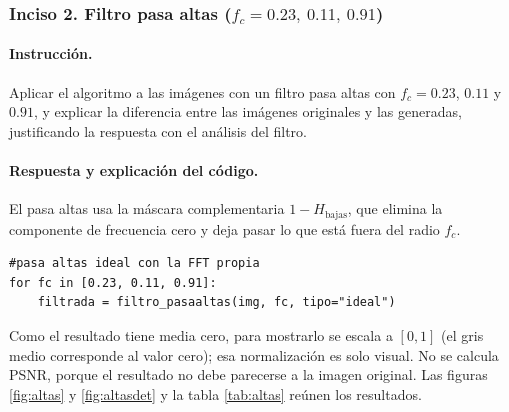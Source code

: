 \documentclass[11pt]{article}
\begin{document}
\FloatBarrier
\subsubsection*{Inciso 2. Filtro pasa altas ($f_c=0.23,\ 0.11,\ 0.91$)}

\paragraph{Instrucción.}
Aplicar el algoritmo a las imágenes con un filtro pasa altas con $f_c=0.23$, $0.11$ y $0.91$, y explicar la diferencia entre las
imágenes originales y las generadas, justificando la respuesta con el análisis del filtro.

\paragraph{Respuesta y explicación del código.}
El pasa altas usa la máscara complementaria $1-H_{\text{bajas}}$, que elimina la componente de frecuencia cero y deja
pasar lo que está fuera del radio $f_c$.

\begin{lstlisting}
#pasa altas ideal con la FFT propia
for fc in [0.23, 0.11, 0.91]:
    filtrada = filtro_pasaaltas(img, fc, tipo="ideal")
\end{lstlisting}

Como el resultado tiene media cero, para mostrarlo se escala a $[0,1]$ (el gris medio corresponde al valor cero); esa
normalización es solo visual. No se calcula PSNR, porque el resultado no debe parecerse a la imagen original. Las
figuras \ref{fig:altas} y \ref{fig:altasdet} y la tabla \ref{tab:altas} reúnen los resultados.
\end{document}
